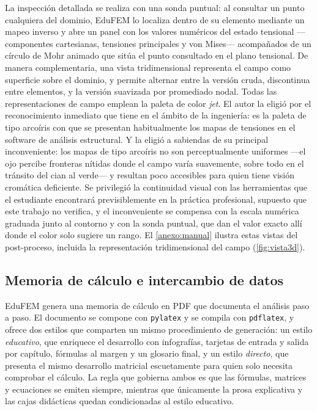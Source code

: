 La inspección detallada se realiza con una sonda puntual: al consultar un punto cualquiera del dominio, EduFEM lo localiza dentro de su elemento mediante un mapeo inverso y abre un panel con los valores numéricos del estado tensional —componentes cartesianas, tensiones principales y von Mises— acompañados de un círculo de Mohr animado que sitúa el punto consultado en el plano tensional. De manera complementaria, una vista tridimensional representa el campo como superficie sobre el dominio, y permite alternar entre la versión cruda, discontinua entre elementos, y la versión suavizada por promediado nodal. Todas las representaciones de campo emplean la paleta de color \emph{jet}. El autor la eligió por el reconocimiento inmediato que tiene en el ámbito de la ingeniería: es la paleta de tipo arcoíris con que se presentan habitualmente los mapas de tensiones en el software de análisis estructural. Y la eligió a sabiendas de su principal inconveniente: los mapas de tipo arcoíris no son perceptualmente uniformes —el ojo percibe fronteras nítidas donde el campo varía suavemente, sobre todo en el tránsito del cian al verde— y resultan poco accesibles para quien tiene visión cromática deficiente. Se privilegió la continuidad visual con las herramientas que el estudiante encontrará previsiblemente en la práctica profesional, supuesto que este trabajo no verifica, y el inconveniente se compensa con la escala numérica graduada junto al contorno y con la sonda puntual, que dan el valor exacto allí donde el color solo sugiere un rango. El \autoref{anexo:manual} ilustra estas vistas del post-proceso, incluida la representación tridimensional del campo (\autoref{fig:vista3d}).

\subsection{Memoria de cálculo e intercambio de datos}
\label{sec:memoria-io}

EduFEM genera una memoria de cálculo en PDF que documenta el análisis paso a paso. El documento se compone con \texttt{pylatex} y se compila con \texttt{pdflatex}, y ofrece dos estilos que comparten un mismo procedimiento de generación: un estilo \emph{educativo}, que enriquece el desarrollo con infografías, tarjetas de entrada y salida por capítulo, fórmulas al margen y un glosario final, y un estilo \emph{directo}, que presenta el mismo desarrollo matricial escuetamente para quien solo necesita comprobar el cálculo. La regla que gobierna ambos es que las fórmulas, matrices y ecuaciones se emiten siempre, mientras que únicamente la prosa explicativa y las cajas didácticas quedan condicionadas al estilo educativo.

